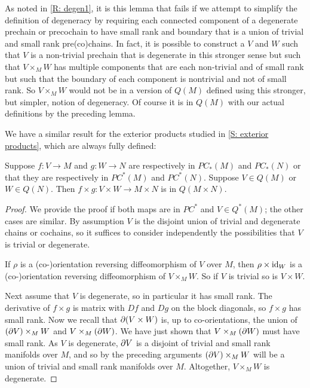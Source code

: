 \begin{remark}\label{R: degen2}
As noted in \cref{R: degen1}, it is this lemma that fails if we attempt to simplify the definition of degeneracy by requiring each connected component of a degenerate prechain or precochain to have small rank and boundary that is a union of trivial and small rank pre(co)chains. In fact, it is possible to construct a $V$ and $W$ such that $V$ is a non-trivial prechain that is degenerate in this stronger sense but such that $V\times_M W$ has multiple components that are each non-trivial and of small rank but such that the boundary of each component is nontrivial and not of small rank. So $V\times_MW$ would not be in a version of $Q(M)$ defined using this stronger, but simpler, notion of degeneracy. Of course it is in $Q(M)$ with our actual definitions by the preceding lemma.
\end{remark}

We have a similar result for the exterior products studied in \cref{S: exterior products}, which are always fully defined:

\begin{lemma}\label{L: exterior Q}
Suppose $f:V\to M$ and $g:W\to N$ are respectively in $PC_*(M)$ and $PC_*(N)$ or that they are respectively in $PC^*(M)$ and $PC^*(N)$. Suppose $V\in Q(M)$ or $W\in Q(N)$. Then $f\times g:V\times W\to M\times N$ is in $Q(M\times N)$.
\end{lemma}
\begin{proof}
We provide the proof if both maps are in $PC^*$ and $V\in Q^*(M)$; the other cases are similar. By assumption $V$ is the disjoint union of trivial and degenerate chains or cochains, so it suffices to consider independently the possibilities that $V$ is trivial or degenerate.

If $\rho$ is a (co-)orientation reversing diffeomorphism of $V$ over $M$, then  $\rho\times  \mathrm{id}_W$ is a (co-)orientation reversing diffeomorphism of  $V\times_M W$. So if $V$ is trivial so is $V\times W$.

Next assume that $V$ is degenerate, so in particular it has small rank. The derivative of $f\times g$ is matrix with $Df$ and $Dg$ on the block diagonals, so $f\times g$ has small rank.
Now we recall that $\partial(V\times W)$ is, up to co-orientations, the union of $(\partial V)\times_M W$ and $V\times_M(\partial W)$. We have just shown that  $V\times_M(\partial W)$ must have small rank. As $V$ is degenerate, $\partial V$ is a disjoint of trivial and small rank manifolds over $M$, and so by the preceding arguments $(\partial V)\times_M W$ will be a union of trivial and small rank manifolds over $M$. Altogether, $V\times_M W$ is degenerate.
\end{proof}



